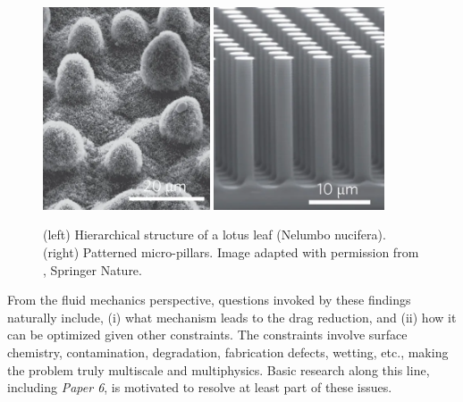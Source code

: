 \begin{figure}%
  \centering
  \includegraphics[height=6cm]{lotus.png}
  \includegraphics[height=6cm]{micro-pillars.png}
  \caption{(left) Hierarchical structure of a lotus leaf (Nelumbo nucifera). (right) Patterned micro-pillars. Image adapted with permission from \cite{Bocquet}, \textcopyright \enspace Springer Nature.}
  \label{fig:micro-surface}
\end{figure}

From the fluid mechanics perspective, questions invoked by these findings naturally include,
(i) what mechanism leads to the drag reduction, and
(ii) how it can be optimized given other constraints.
The constraints involve surface chemistry, contamination, degradation, fabrication defects, wetting, etc., making the problem truly multiscale and multiphysics.
Basic research along this line, including \emph{Paper 6}, is motivated to resolve at least part of these issues.

